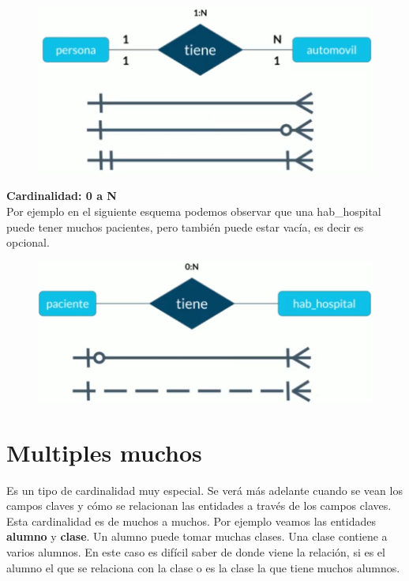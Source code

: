\documentclass{article}
\begin{document}
\begin{figure}[h!]
    \centering
      \includegraphics[scale=0.5]{./Pictures/016_card_1_N.png}
\end{figure}

\textbf{Cardinalidad: 0 a N}\\
Por ejemplo en el siguiente esquema podemos observar que una hab\_hospital
puede tener muchos pacientes, pero también puede estar vacía, es decir es
opcional.

\begin{figure}[h!]
    \centering
      \includegraphics[scale=0.5]{./Pictures/017_card_0_N.png}
\end{figure}


\section{Multiples muchos}%
Es un tipo de cardinalidad muy especial. Se verá más adelante cuando se vean
los campos claves y cómo se relacionan las entidades a través de los campos
claves.\\

Esta cardinalidad es de muchos a muchos. Por ejemplo veamos las entidades
\textbf{alumno} y \textbf{clase}. Un alumno puede tomar muchas clases. Una
clase contiene a varios alumnos. En este caso es difícil saber de donde viene
la relación, si es el alumno el que se relaciona con la clase o es la clase la
que tiene muchos alumnos.
\end{document}
